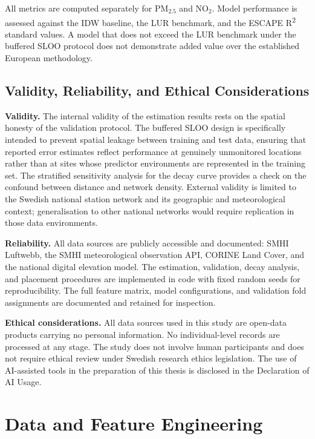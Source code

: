 \documentclass[11pt,a4paper]{article}
\let\oldsection\section
\renewcommand{\section}{\FloatBarrier\oldsection}
\let\oldsubsection\subsection
\renewcommand{\subsection}{\FloatBarrier\oldsubsection}
\begin{document}
All metrics are computed separately for PM$_{2.5}$ and NO$_2$. Model performance is assessed against the IDW baseline, the LUR benchmark, and the ESCAPE R\textsuperscript{2} standard values. A model that does not exceed the LUR benchmark under the buffered SLOO protocol does not demonstrate added value over the established European methodology.

\subsection{Validity, Reliability, and Ethical Considerations}
\label{sec:ethics}

\textbf{Validity.} The internal validity of the estimation results rests on the spatial honesty of the validation protocol. The buffered SLOO design \cite{valavi_blockcv_2019, roberts_spatial_cv_2017} is specifically intended to prevent spatial leakage between training and test data, ensuring that reported error estimates reflect performance at genuinely unmonitored locations rather than at sites whose predictor environments are represented in the training set. The stratified sensitivity analysis for the decay curve provides a check on the confound between distance and network density. External validity is limited to the Swedish national station network and its geographic and meteorological context; generalisation to other national networks would require replication in those data environments.

\textbf{Reliability.} All data sources are publicly accessible and documented: SMHI Luftwebb, the SMHI meteorological observation API, CORINE Land Cover, and the national digital elevation model. The estimation, validation, decay analysis, and placement procedures are implemented in code with fixed random seeds for reproducibility. The full feature matrix, model configurations, and validation fold assignments are documented and retained for inspection.

\textbf{Ethical considerations.} All data sources used in this study are open-data products carrying no personal information. No individual-level records are processed at any stage. The study does not involve human participants and does not require ethical review under Swedish research ethics legislation. The use of AI-assisted tools in the preparation of this thesis is disclosed in the Declaration of AI Usage.

\section{Data and Feature Engineering}
\label{sec:data}
\end{document}

